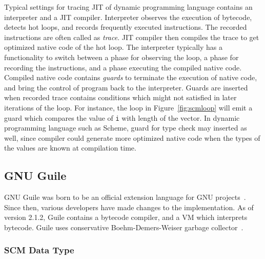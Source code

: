 \documentclass[preprint, 10pt]{sigplanconf}
\begin{document}
Typical settings for tracing JIT of dynamic programming language contains an
interpreter and a JIT compiler. Interpreter observes the execution of bytecode,
detects hot loops, and records frequently executed instructions. The recorded
instructions are often called as \textit{trace}. JIT compiler then compiles the
trace to get optimized native code of the hot loop. The interpreter typically
has a functionality to switch between a phase for observing the loop, a phase
for recording the instructions, and a phase executing the compiled native code.
Compiled native code contains \textit{guards} to terminate the execution of
native code, and bring the control of program back to the interpreter. Guards
are inserted when recorded trace contains conditions which might not satisfied
in later iterations of the loop. For instance, the loop in
Figure~\hyperref[fig:scmloop]{\ref{fig:scmloop}} will emit a guard which
compares the value of \texttt{i} with length of the vector. In dynamic
programming language such as Scheme, guard for type check may inserted as well,
since compiler could generate more optimized native code when the types of the
values are known at compilation time.

\subsection{GNU Guile}
\label{sec:backgroundguile}

GNU Guile was born to be an official extension language for GNU
projects~\cite{Galassi02guilereference}. Since then, various developers have
made changes to the implementation. As of version 2.1.2, Guile contains a
bytecode compiler, and a VM which interprets bytecode. Guile uses conservative
Boehm-Demers-Weiser garbage collector~\cite{boehm1988garbage}.


\subsubsection{SCM Data Type}
\label{sec:scmdatatype}
\end{document}
